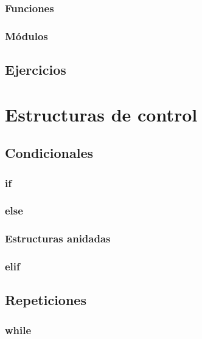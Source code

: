 \documentclass[a4paper,12pt,spanish]{sphinxmanual}
\begin{document}
\subsection{Funciones}
\label{Unidad01:funciones}

\subsection{Módulos}
\label{Unidad01:modulos}

\section{Ejercicios}
\label{Unidad01:ejercicios}

\chapter{Estructuras de control}
\label{Unidad02::doc}\label{Unidad02:estructuras-de-control}

\section{Condicionales}
\label{Unidad02:condicionales}

\subsection{if}
\label{Unidad02:if}

\subsection{else}
\label{Unidad02:else}

\subsection{Estructuras anidadas}
\label{Unidad02:estructuras-anidadas}

\subsection{elif}
\label{Unidad02:elif}

\section{Repeticiones}
\label{Unidad02:repeticiones}

\subsection{while}
\label{Unidad02:while}
\end{document}
